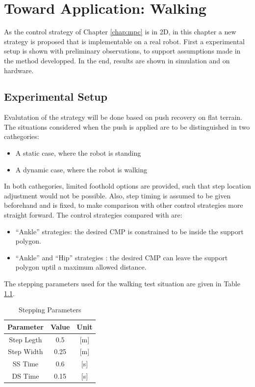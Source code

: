 %
\chapter{Toward Application: Walking}\label{chap:walking}
As the control strategy of Chapter \ref{chap:mpc} is in \ac{2D}, in this chapter a new strategy is proposed that is implementable on a real robot. First a experimental setup is shown with preliminary observations, to support assumptions made in the method developped. In the end, results are shown in simulation and on hardware.
\section{Experimental Setup}
Evalutation of the strategy will be done based on push recovery on flat terrain. The situations considered when the push is applied are to be distinguished in two cathegories:
\begin{itemize}
	\item A static case, where the robot is standing
	\item A dynamic case, where the robot is walking
\end{itemize}
In both cathegories, limited foothold options are provided, such that step location adjustment would not be possible. Also, step timing is assumed to be given beforehand and is fixed, to make comparison with other control strategies more straight forward. The control strategies compared with are:
\begin{itemize}
	\item ``Ankle'' strategies: the desired \ac{CMP} is constrained to be inside the support polygon. 
	\item ``Ankle'' and ``Hip'' strategies : the desired \ac{CMP} can leave the support polygon uptil a maximum allowed distance.
\end{itemize}
The stepping parameters used for the walking test situation are given in Table \ref{tab:stepping}.
\begin{table}[ht]
\caption{Stepping Parameters} %
\centering %
\begin{tabular}{c c c } %
\hline\hline %
Parameter & Value & Unit \\
\hline %
Step Legth & 0.5 &  [m]\\
Step Width & 0.25 & [m]\\
\acs{SS} Time & 0.6 & [s]\\
\acs{DS} Time & 0.15 & [s]\\
\hline %
\end{tabular}
\label{tab:stepping} %
\end{table}
